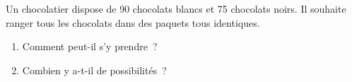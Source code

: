 \documentclass[exercice]{thedocument}%
\begin{document}
%
Un chocolatier dispose de 90 chocolats blancs et 75 chocolats noirs. Il
souhaite ranger tous les chocolats dans des paquets tous identiques.
\begin{enumerate}
    \item Comment peut-il s'y prendre~?
    \item Combien y a-t-il de possibilités~?
\end{enumerate}
\end{document}
